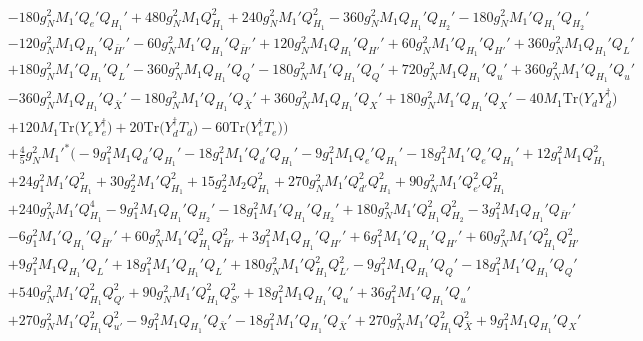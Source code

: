 {\begin{align}
 &-180 g_{N}^{2} M_1' Q_e' Q_{H_1}' +480 g_{N}^{2} M_1 Q_{H_1}^{2} +240 g_{N}^{2} M_1' Q_{H_1}^{2} -360 g_{N}^{2} M_1 Q_{H_1}' Q_{H_2}' -180 g_{N}^{2} M_1' Q_{H_1}' Q_{H_2}' \nonumber \\ 
 &-120 g_{N}^{2} M_1 Q_{H_1}' Q_{\bar{H}'}' -60 g_{N}^{2} M_1' Q_{H_1}' Q_{\bar{H}'}' +120 g_{N}^{2} M_1 Q_{H_1}' Q_{H'}' +60 g_{N}^{2} M_1' Q_{H_1}' Q_{H'}' +360 g_{N}^{2} M_1 Q_{H_1}' Q_L' \nonumber \\ 
 &+180 g_{N}^{2} M_1' Q_{H_1}' Q_L' -360 g_{N}^{2} M_1 Q_{H_1}' Q_Q' -180 g_{N}^{2} M_1' Q_{H_1}' Q_Q' +720 g_{N}^{2} M_1 Q_{H_1}' Q_u' +360 g_{N}^{2} M_1' Q_{H_1}' Q_u' \nonumber \\ 
 &-360 g_{N}^{2} M_1 Q_{H_1}' Q_{\bar{X}}' -180 g_{N}^{2} M_1' Q_{H_1}' Q_{\bar{X}}' +360 g_{N}^{2} M_1 Q_{H_1}' Q_X' +180 g_{N}^{2} M_1' Q_{H_1}' Q_X' -40 M_1 \mbox{Tr}\Big({Y_d  Y_{d}^{\dagger}}\Big) \nonumber \\ 
 &+120 M_1 \mbox{Tr}\Big({Y_e  Y_{e}^{\dagger}}\Big) +20 \mbox{Tr}\Big({Y_{d}^{\dagger}  T_d}\Big) -60 \mbox{Tr}\Big({Y_{e}^{\dagger}  T_e}\Big) \Big)\nonumber \\ 
 &+\frac{4}{5} g_{N}^{2} M_1'^* \Big(-9 g_{1}^{2} M_1 Q_d' Q_{H_1}' -18 g_{1}^{2} M_1' Q_d' Q_{H_1}' -9 g_{1}^{2} M_1 Q_e' Q_{H_1}' -18 g_{1}^{2} M_1' Q_e' Q_{H_1}' +12 g_{1}^{2} M_1 Q_{H_1}^{2} \nonumber \\ 
 &+24 g_{1}^{2} M_1' Q_{H_1}^{2} +30 g_{2}^{2} M_1' Q_{H_1}^{2} +15 g_{2}^{2} M_2 Q_{H_1}^{2} +270 g_{N}^{2} M_1' Q_{d'}^{2} Q_{H_1}^{2} +90 g_{N}^{2} M_1' Q_{e'}^{2} Q_{H_1}^{2} \nonumber \\ 
 &+240 g_{N}^{2} M_1' Q_{H_1}^{4} -9 g_{1}^{2} M_1 Q_{H_1}' Q_{H_2}' -18 g_{1}^{2} M_1' Q_{H_1}' Q_{H_2}' +180 g_{N}^{2} M_1' Q_{H_1}^{2} Q_{H_2}^{2} -3 g_{1}^{2} M_1 Q_{H_1}' Q_{\bar{H}'}' \nonumber \\ 
 &-6 g_{1}^{2} M_1' Q_{H_1}' Q_{\bar{H}'}' +60 g_{N}^{2} M_1' Q_{H_1}^{2} Q_{\bar{H}'}^{2} +3 g_{1}^{2} M_1 Q_{H_1}' Q_{H'}' +6 g_{1}^{2} M_1' Q_{H_1}' Q_{H'}' +60 g_{N}^{2} M_1' Q_{H_1}^{2} Q_{H'}^{2} \nonumber \\ 
 &+9 g_{1}^{2} M_1 Q_{H_1}' Q_L' +18 g_{1}^{2} M_1' Q_{H_1}' Q_L' +180 g_{N}^{2} M_1' Q_{H_1}^{2} Q_{L'}^{2} -9 g_{1}^{2} M_1 Q_{H_1}' Q_Q' -18 g_{1}^{2} M_1' Q_{H_1}' Q_Q' \nonumber \\ 
 &+540 g_{N}^{2} M_1' Q_{H_1}^{2} Q_{Q'}^{2} +90 g_{N}^{2} M_1' Q_{H_1}^{2} Q_{S'}^{2} +18 g_{1}^{2} M_1 Q_{H_1}' Q_u' +36 g_{1}^{2} M_1' Q_{H_1}' Q_u' \nonumber \\ 
 &+270 g_{N}^{2} M_1' Q_{H_1}^{2} Q_{u'}^{2} -9 g_{1}^{2} M_1 Q_{H_1}' Q_{\bar{X}}' -18 g_{1}^{2} M_1' Q_{H_1}' Q_{\bar{X}}' +270 g_{N}^{2} M_1' Q_{H_1}^{2} Q_{\bar{X}}^{2} +9 g_{1}^{2} M_1 Q_{H_1}' Q_X' \nonumber \\ 

\end{align}}
